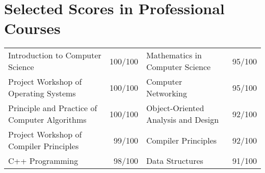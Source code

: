 \documentclass[letterpaper]{article}
\begin{document}
\vspace{-2mm}
\section*{Selected Scores in Professional Courses}

\begin{tabular}{lr|lr}
  Introduction to Computer Science & 100/100 &
    Mathematics in Computer Science & 95/100 \\
  Project Workshop of Operating Systems & 100/100 &
    Computer Networking & 95/100 \\
  Principle and Practice of Computer Algorithms & 100/100 &
    Object-Oriented Analysis and Design & 92/100 \\
  Project Workshop of Compiler Principles & 99/100 &
    Compiler Principles & 92/100 \\
  C++ Programming & 98/100 &
    Data Structures & 91/100
\end{tabular}
\end{document}
